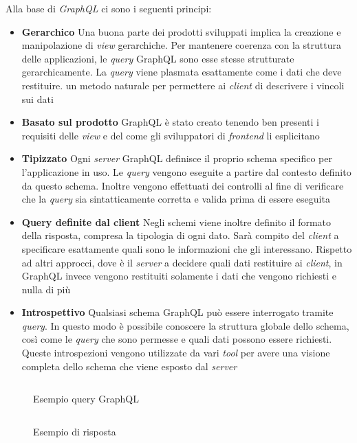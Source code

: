 Alla base di \emph{GraphQL} ci sono i seguenti principi:

\begin{itemize}
	\item \textbf{Gerarchico}
	Una buona parte dei prodotti sviluppati implica la creazione e manipolazione di \emph{view} gerarchiche. Per mantenere coerenza con la struttura delle applicazioni, le \emph{query} GraphQL sono esse stesse strutturate gerarchicamente. La \emph{query} viene plasmata esattamente come i dati che deve restituire. \upe un metodo naturale per permettere ai \emph{client} di descrivere i vincoli sui dati
	\item \textbf{Basato sul prodotto}
	GraphQL è stato creato tenendo ben presenti i requisiti delle \emph{view} e del come gli sviluppatori di \emph{frontend} li esplicitano
	\item \textbf{Tipizzato}
	Ogni \emph{server} GraphQL definisce il proprio schema specifico per l'applicazione in uso. Le \emph{query} vengono eseguite a partire dal contesto definito da questo schema. Inoltre vengono effettuati dei controlli al fine di verificare che la \emph{query} sia sintatticamente corretta e valida  prima di essere eseguita
	\item \textbf{Query definite dal client}
	Negli schemi viene inoltre definito il formato della risposta, compresa la tipologia di ogni dato. Sarà compito del \emph{client} a specificare esattamente quali sono le informazioni che gli interessano. Rispetto ad altri approcci, dove è il \emph{server} a decidere quali dati restituire ai \emph{client}, in GraphQL invece vengono restituiti solamente i dati che vengono richiesti e nulla di più
	\item \textbf{Introspettivo}
	Qualsiasi schema GraphQL può essere interrogato tramite \emph{query}. In questo modo è possibile conoscere la struttura globale dello schema, così come le \emph{query} che sono permesse e quali dati possono essere richiesti. Queste introspezioni vengono utilizzate da vari \emph{tool} per avere una visione completa dello schema che viene esposto dal \emph{server}
\end{itemize}

\begin{figure}[ht]
	\begin{minipage}[t]{0.49\textwidth}
		\begin{listing}[H]
			\inputminted{text}{2-preliminari/Codice/esempio_query_graphql.graphql}
			\caption{Esempio query GraphQL}
			\label{lst:esempio-query-graphql}
		\end{listing}
	\end{minipage}%
	\hspace{2mm}%
	\begin{minipage}[t]{0.49\textwidth}
		\begin{listing}[H]
			\inputminted{json}{2-preliminari/Codice/esempio_risposta_graphql.json}
			\caption{Esempio di risposta}
			\label{lst:esempio-risposta-graphql}
		\end{listing}
	\end{minipage}	
\end{figure}

